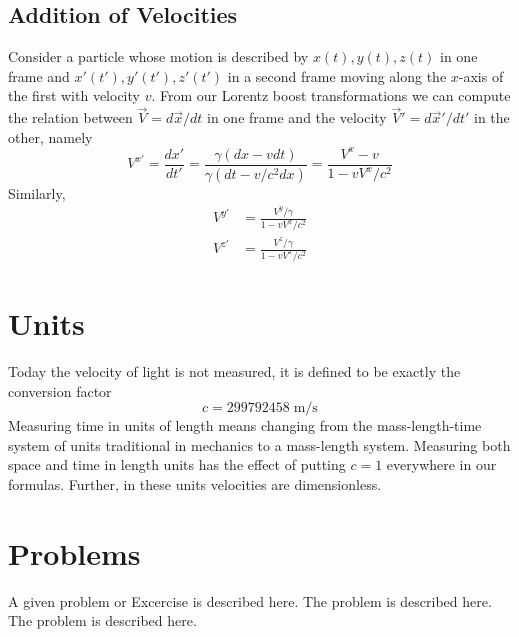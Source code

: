 \subsection{Addition of Velocities}

Consider a particle whose motion is described by $x(t),y(t),z(t)$ in one frame and $x'(t'),y'(t'),z'(t')$ in a second frame moving along the $x$-axis of the first with velocity $v$. From our Lorentz boost transformations we can compute the relation between $\vec{V} = d\vec{x}/dt$ in one frame and the velocity $\vec{V}' = d\vec{x}'/dt'$ in the other, namely $$V^{x'} = \frac{dx'}{dt'} = \frac{\gamma(dx-vdt)}{\gamma(dt-v/c^2dx)} = \frac{V^x-v}{1-vV^x/c^2}$$
Similarly, \begin{align*}
    V^{y'} &= \frac{V^y/\gamma}{1-vV^x/c^2} \\
    V^{z'} &= \frac{V^z/\gamma}{1-vV^x/c^2}
\end{align*}

\section{Units}

Today the velocity of light is not measured, it is defined to be exactly the conversion factor $$c = 299792458\;\text{m/s}$$
Measuring time in units of length means changing from the mass-length-time system of units traditional in mechanics to a mass-length system. Measuring both space and time in length units has the effect of putting $c=1$ everywhere in our formulas. Further, in these units velocities are dimensionless.






%
%
%


\section*{Problems}
%
\begin{prob}
\label{prob1}
A given problem or Excercise is described here. The
problem is described here. The problem is described here.
\end{prob}



